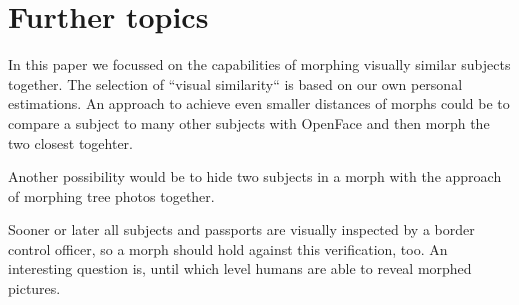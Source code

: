 \section{Further topics}
\label{FurtherTopics}
In this paper we focussed on the capabilities of morphing visually similar subjects together. The selection of ``visual similarity`` is based on our own personal estimations. An approach to achieve even smaller distances of morphs could be to compare a subject to many other subjects with OpenFace and then morph the two closest togehter. 


Another possibility would be to hide two subjects in a morph with the approach of morphing tree photos together. 


Sooner or later all subjects and passports are visually inspected by a border control officer, so a morph should hold against this verification, too. An interesting question is, until which level humans are able to reveal morphed pictures.